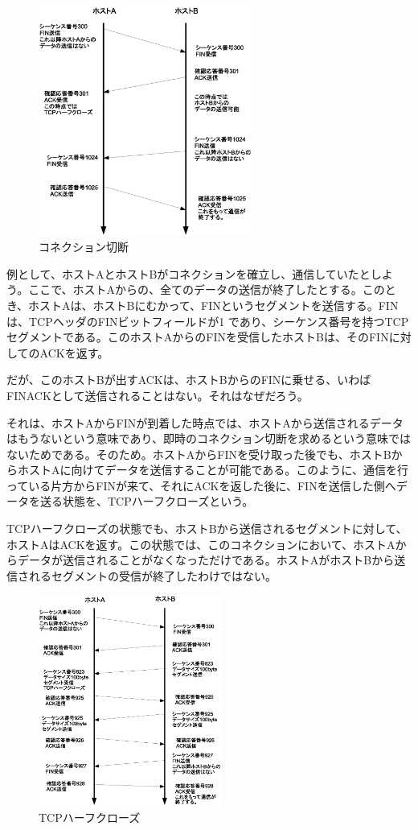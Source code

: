 \begin{figure}
	\includegraphics[width=7cm, clip]{draw/tcp05n.eps}
	\caption{コネクション切断}
	\label{fig:tcp05}
\end{figure}

例として、ホストAとホストBがコネクションを確立し、通信していたとしよう。ここで、ホストAからの、全てのデータの送信が終了したとする。このとき、ホストAは、ホストBにむかって、FINというセグメントを送信する。FINは、TCPヘッダのFINビットフィールドが1 であり、シーケンス番号を持つTCPセグメントである。このホストAからのFINを受信したホストBは、そのFINに対してのACKを返す。

だが、このホストBが出すACKは、ホストBからのFINに乗せる、いわばFINACKとして送信されることはない。それはなぜだろう。

それは、ホストAからFINが到着した時点では、ホストAから送信されるデータはもうないという意味であり、即時のコネクション切断を求めるという意味ではないためである。そのため。ホストAからFINを受け取った後でも、ホストBからホストAに向けてデータを送信することが可能である。このように、通信を行っている片方からFINが来て、それにACKを返した後に、FINを送信した側へデータを送る状態を、TCPハーフクローズという。

TCPハーフクローズの状態でも、ホストBから送信されるセグメントに対して、ホストAはACKを返す。この状態では、このコネクションにおいて、ホストAからデータが送信されることがなくなっただけである。ホストAがホストBから送信されるセグメントの受信が終了したわけではない。

\begin{figure}
	\includegraphics[width=6cm, clip]{draw/tcp06n.eps}
	\caption{TCPハーフクローズ}
	\label{fig:tcp06}
\end{figure}



